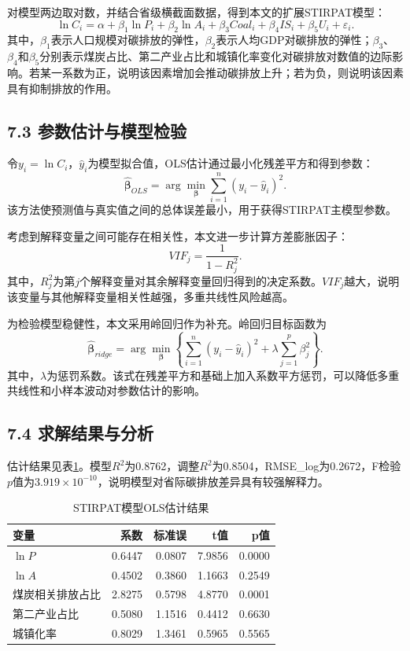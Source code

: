 \documentclass[UTF8,zihao=-4,fontset=fandol]{ctexart}
\begin{document}
对模型两边取对数，并结合省级横截面数据，得到本文的扩展STIRPAT模型：
\[
\ln C_i=\alpha+\beta_1\ln P_i+\beta_2\ln A_i+\beta_3Coal_i+\beta_4IS_i+\beta_5U_i+\varepsilon_i.
\]
其中，$\beta_1$表示人口规模对碳排放的弹性，$\beta_2$表示人均GDP对碳排放的弹性；$\beta_3$、$\beta_4$和$\beta_5$分别表示煤炭占比、第二产业占比和城镇化率变化对碳排放对数值的边际影响。若某一系数为正，说明该因素增加会推动碳排放上升；若为负，则说明该因素具有抑制排放的作用。

\subsection*{7.3 参数估计与模型检验}

令$y_i=\ln C_i$，$\hat{y}_i$为模型拟合值，OLS估计通过最小化残差平方和得到参数：
\[
\hat{\boldsymbol\beta}_{OLS}=\arg\min_{\boldsymbol\beta}\sum_{i=1}^{n}(y_i-\hat{y}_i)^2.
\]
该方法使预测值与真实值之间的总体误差最小，用于获得STIRPAT主模型参数。

考虑到解释变量之间可能存在相关性，本文进一步计算方差膨胀因子：
\[
VIF_j=\frac{1}{1-R_j^2}.
\]
其中，$R_j^2$为第$j$个解释变量对其余解释变量回归得到的决定系数。$VIF_j$越大，说明该变量与其他解释变量相关性越强，多重共线性风险越高。

为检验模型稳健性，本文采用岭回归作为补充。岭回归目标函数为
\[
\hat{\boldsymbol\beta}_{ridge}
=\arg\min_{\boldsymbol\beta}\left\{\sum_{i=1}^{n}(y_i-\hat{y}_i)^2+\lambda\sum_{j=1}^{p}\beta_j^2\right\}.
\]
其中，$\lambda$为惩罚系数。该式在残差平方和基础上加入系数平方惩罚，可以降低多重共线性和小样本波动对参数估计的影响。

\subsection*{7.4 求解结果与分析}

估计结果见表\ref{tab:ols}。模型$R^2$为0.8762，调整$R^2$为0.8504，RMSE\_log为0.2672，F检验$p$值为$3.919\times10^{-10}$，说明模型对省际碳排放差异具有较强解释力。

\begin{table}[H]
\centering
\caption{STIRPAT模型OLS估计结果}
\label{tab:ols}
\begin{tabular}{lrrrr}
\toprule
变量 & 系数 & 标准误 & t值 & p值 \\
\midrule
$\ln P$ & 0.6447 & 0.0807 & 7.9856 & 0.0000 \\
$\ln A$ & 0.4502 & 0.3860 & 1.1663 & 0.2549 \\
煤炭相关排放占比 & 2.8275 & 0.5798 & 4.8770 & 0.0001 \\
第二产业占比 & 0.5080 & 1.1516 & 0.4412 & 0.6630 \\
城镇化率 & 0.8029 & 1.3461 & 0.5965 & 0.5565 \\
\bottomrule
\end{tabular}
\end{table}
\end{document}

